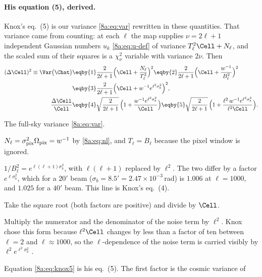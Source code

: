 \paragraph{His equation (5), derived.}
Knox's eq.~(5) is our variance \eqref{8a:eq:var} rewritten in these quantities. That variance
came from counting: at each $\ell$ the map supplies $\nu=2\ell+1$ independent Gaussian numbers
$u_k$ \eqref{8a:eq:u-def} of variance $T_\ell^2\Cell+N_\ell$, and the scaled sum of their squares is a $\chi^2_\nu$
variable with variance $2\nu$. Then
\begin{align}
  (\Delta\Cell)^2\equiv\Var\bigl(\Chat\bigr)
  &\eqby{1}\frac{2}{2\ell+1}\Bigl(\Cell+\frac{N_\ell}{T_\ell^2}\Bigr)^2
   \eqby{2}\frac{2}{2\ell+1}\Bigl(\Cell+\frac{w^{-1}}{B_\ell^2}\Bigr)^2
   \nonumber\\
  &\eqby{3}\frac{2}{2\ell+1}\Bigl(\Cell+w^{-1}e^{\ell^2\sigma_b^2}\Bigr)^2 ,
  \label{8a:eq:knox4}\\
  \frac{\Delta\Cell}{\Cell}
  &\eqby{4}\sqrt{\frac{2}{2\ell+1}}\,\Bigl(1+\frac{w^{-1}e^{\ell^2\sigma_b^2}}{\Cell}\Bigr)
   \eqby{5}\sqrt{\frac{2}{2\ell+1}}\,\Bigl(1+\frac{\ell^2\,w^{-1}e^{\ell^2\sigma_b^2}}{\ell^2\Cell}\Bigr).
  \label{8a:eq:knox5}
\end{align}
\begin{explain}
  \item The full-sky variance \eqref{8a:eq:var}.
  \item $N_\ell=\sigma_{\rm pix}^2\Omega_{\rm pix}=w^{-1}$ by \eqref{8a:eq:nl}, and $T_\ell=B_\ell$
        because the pixel window is ignored.
  \item $1/B_\ell^2=e^{\ell(\ell+1)\sigma_b^2}$, with $\ell(\ell+1)$ replaced by $\ell^2$. The two
        differ by a factor $e^{\ell\sigma_b^2}$, which for a $20'$ beam ($\sigma_b=8.5'=2.47\times10^{-3}$\,rad)
        is $1.006$ at $\ell=1000$, and $1.025$ for a $40'$ beam. This line is Knox's eq.~(4).
  \item Take the square root (both factors are positive) and divide by $\Cell$.
  \item Multiply the numerator and the denominator of the noise term by $\ell^2$. Knox chose this
        form because $\ell^2\Cell$ changes by less than a factor of ten between $\ell=2$ and
        $\ell\approx1000$, so the $\ell$-dependence of the noise term is carried visibly by
        $\ell^2e^{\ell^2\sigma_b^2}$ .
\end{explain}
Equation \eqref{8a:eq:knox5} is his eq.~(5). The first factor is the cosmic variance of
